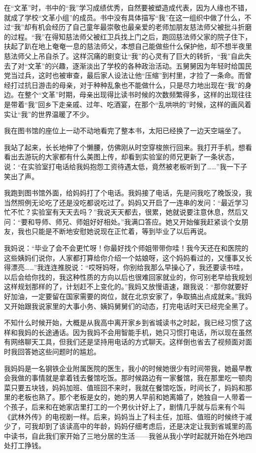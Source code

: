\documentclass[openany,scheme = chinese, linespread = 1.5]{ctexbook}
\begin{document}
在“文革”时，书中的“我”学习成绩优秀，自然要被塑造成代表，因为人缘也不错，就成了学校“文革小组”的成员。书中没有具体描写“我”在这一组织中做了什么，不过“我”却有机会经历了自己童年最崇敬也最亲爱的老师加朋友慈法师父被批斗折磨的过程。“我”在得知慈法师父被红卫兵找上门之后，跑回慈法师父家的院子住下，扶起了趴在地上奄奄一息的慈法师父，本想自己能做些什么保护他，却不想半夜里慈法师父上吊自杀了。这样沉痛的剧变让“我”的心灵有了巨大的转折，“我”自此失去了对“文革”的兴趣，逐渐淡出了学校的各种政治活动。五舅舅因为年轻时给国民党当过兵，这时也被审查，最后家人设法让他“压缩”到村里，才捡了一条命。而曾经打过抗日游击的母亲，对于种种乱象也不能做什么，只是尽力地出现在“我”的身边。在整个“文革”时期，母亲出现得比读书时候的次数频繁得多，这样的出现往往是带着“我”回乡下走亲戚、过年、吃酒宴，在那个“乱哄哄的”时候，这样的画风着实让“我”的世界温暖了不少。

我在图书馆的座位上一动不动地看完了整本书，太阳已经换了一边天空端坐了。

我站了起来，长长地伸了个懒腰，仿佛刚从时空穿梭旅行回来。我打开手机，想看看出去游玩的大家都有什么美图上传，却看到实验室的师兄更新了一条状态，说：“在实验室打电话给我妈抱怨工资待遇太低，竟然被老板听到了……”我一下子笑出了声。

我跑到图书馆外面，给妈妈打了个电话。我妈接了电话，先是问我吃了晚饭没，我当然照例无论吃了还是没吃都说吃过了。妈妈又开启了一连串的发问：“最近学习忙不忙？实验室有天天去吗？”我说天天都去，很累，她就说要注意休息，然后又问：“要和导师、师兄、师姐好好相处。”我满口答应。她又开始催我赶紧谈个女朋友，我也只能是不断地安慰她说现在正忙着，等到毕业了以后再说。

我妈说：“毕业了会不会更忙呀！你最好找个师姐带带你哇！我今天还在和医院的这些姨妈们说你，人家都打算给你介绍一个姑娘呀，这个妈妈看过的，又懂事又长得漂亮……”我连连推脱说：“哎呀妈呀，你别给我那么早操心了，我还要读书哇，以后会给你找的，我这种性质的方向以后也很难回家就业的，你可别老早给我规划这样规划那样的了，计划赶不上变化的。”我妈又放慢语速，跟我说：“那你就要好好加油，一定要留在国家需要的岗位，就在北京安家了，争取搞出点成就来。”我妈又开始跟我说家里的大事小务、姨妈舅舅们的动态，打完电话时天已经完全黑了。

不知什么时候开始，大概是从我高中离开家乡到省城读书之时起，我已经习惯了这样和我妈的长途通话。因为我妈不会用智能手机，她只习惯打电话，所以现在虽然有网络聊天工具，但我们还是坚持用电话的方式聊天。这样倒也省去了视频面对面时我回答她这些问题时的尴尬。

我妈妈是一名钢铁企业附属医院的医生，我小的时候她很少有时间带我，她最早教会我做的事情就是拿着钱去餐馆吃饭。那时候路边有一家餐馆，我在那里吃一顿肉菜只要五块钱，妈妈加班、值班回不来时，我就在餐馆吃饭，时间长了，妈妈和那里的老板也熟了。那个老板是女的，她的男人早前和她离婚了，她独自一人带着一个孩子，后来和在她家店里打工的一个男伙计好上了，剧情几乎就与后来有个叫《武林外传》的电视剧一样。后来，妈妈当上了科主任，加班、值班的时候终于减少了，可我却到了该读高中的年龄，妈妈仔细考虑后，还是决定让我到省城里的高中读书，自此我们家开始了三地分居的生活——我爸从我小学时起就开始在外地四处打工挣钱。
\end{document}

